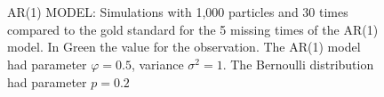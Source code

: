 \begin{figure}
    \\
    \\
    \caption{AR(1) MODEL: Simulations with 1,000 particles and 30 times compared to the gold standard for the 5 missing times of the AR(1) model. In Green the value for the observation. The AR(1) model had parameter $\varphi = 0.5$, variance $\sigma^2 = 1$. The Bernoulli distribution had parameter $p = 0.2$}
\label{fig:1}
\end{figure}

